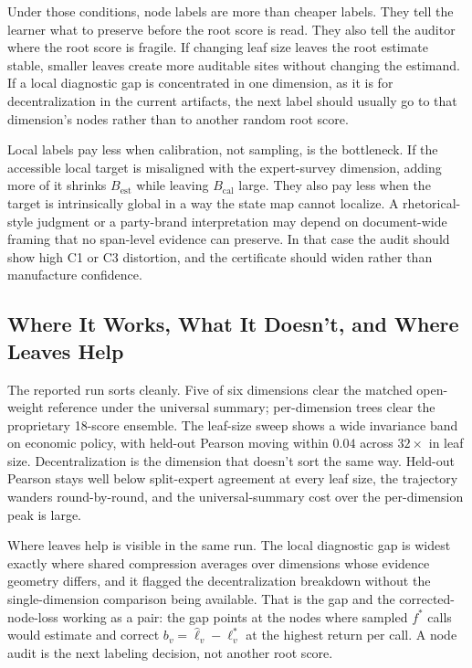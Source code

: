 Under those conditions, node labels are more than cheaper labels. They tell the
learner what to preserve before the root score is read. They also tell the
auditor where the root score is fragile. If changing leaf size leaves the root
estimate stable, smaller leaves create more auditable sites without changing
the estimand. If a local diagnostic gap is concentrated in one dimension, as it
is for decentralization in the current artifacts, the next label should usually
go to that dimension's nodes rather than to another random root score.

Local labels pay less when calibration, not sampling, is the
bottleneck. If the accessible local target is misaligned with the
expert-survey dimension, adding more of it shrinks
\(B_{\mathrm{est}}\) while leaving \(B_{\mathrm{cal}}\) large. They
also pay less when the target is intrinsically global in a way the
state map cannot localize. A rhetorical-style judgment or a
party-brand interpretation may depend on document-wide framing that no
span-level evidence can preserve. In that case the audit should show
high C1 or C3 distortion, and the certificate should widen rather than
manufacture confidence.

\subsection{Where It Works, What It Doesn't, and Where Leaves Help}

The reported run sorts cleanly. Five of six dimensions clear the
matched open-weight reference under the universal summary;
per-dimension trees clear the proprietary 18-score ensemble. The
leaf-size sweep shows a wide invariance band on economic policy,
with held-out Pearson moving within \(0.04\) across \(32\times\)
in leaf size. Decentralization is the dimension that doesn't sort
the same way. Held-out Pearson stays well below split-expert
agreement at every leaf size, the trajectory wanders round-by-round,
and the universal-summary cost over the per-dimension peak is large.

Where leaves help is visible in the same run. The local diagnostic
gap is widest exactly where shared compression averages over
dimensions whose evidence geometry differs, and it flagged the
decentralization breakdown without the single-dimension comparison
being available. That is the gap and the
corrected-node-loss working as a pair: the gap points at the nodes
where sampled \(f^\ast\) calls would estimate and correct
\(b_v=\widehat\ell_v-\ell_v^\ast\) at the highest return per call.
A node audit is the next labeling decision, not another root score.

